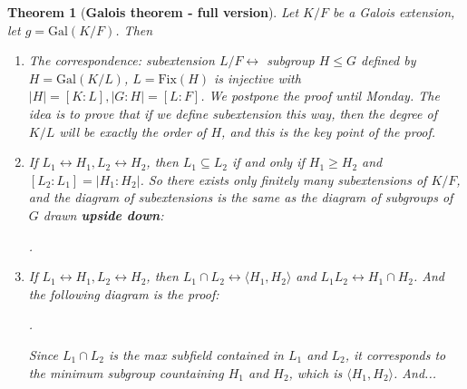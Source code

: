 \documentclass[9pt,reqno,twoside]{amsbook}
\theoremstyle{plain}
\newtheorem{theorem}{Theorem}[chapter]
\numberwithin{section}{chapter}
\numberwithin{equation}{chapter}
\theoremstyle{definition}
\theoremstyle{remark}
\theoremstyle{plain}
\newcommand{\sub}{\subseteq}
\newcommand{\gal}{\mathrm{Gal}}
\newcommand{\fix}{\mathrm{Fix}}
\renewcommand{\leq}{\leqslant}
\renewcommand{\geq}{\geqslant}
\begin{document}
\begin{theorem}[\textbf{Galois theorem - full version}]
Let $K/F$ be a Galois extension, let $g = \gal(K/F)$. Then \begin{enumerate}
\item The correspondence: subextension $L/F \leftrightarrow$ subgroup $H \leq G$ defined by $H = \gal(K/L)$, $L = \fix(H)$ is injective with  $|H| = [K:L],|G:H| = [L:F]$. We postpone the proof until Monday. The idea is to prove that if we define subextension this way, then the degree of $K/L$ will be exactly the order of $H$, and this is the key point of the proof. 
\item If $L_1 \leftrightarrow H_1, L_2 \leftrightarrow H_2$, then $L_1 \sub L_2$ if and only if $H_1 \geq H_2$ and $[L_2:L_1] = |H_1:H_2|$. So there exists only finitely many subextensions of $K/F$, and the diagram of subextensions is the same as the diagram of subgroups of $G$ drawn \textbf{upside down}:
\begin{center}
.
\end{center}
\item If $L_1 \leftrightarrow H_1, L_2 \leftrightarrow H_2$, then $L_1 \cap L_2 \leftrightarrow \langle H_1,H_2 \rangle$ and $L_1L_2\leftrightarrow H_1 \cap H_2$. And the following diagram is the proof:
\begin{center}
.
\end{center}
Since $L_1 \cap L_2$ is the max subfield contained in $L_1$ and $L_2$, it corresponds to the minimum subgroup countaining $H_1$ and $H_2$, which is $\langle H_1, H_2 \rangle$. And...


\end{enumerate}
\end{theorem}
\end{document}
